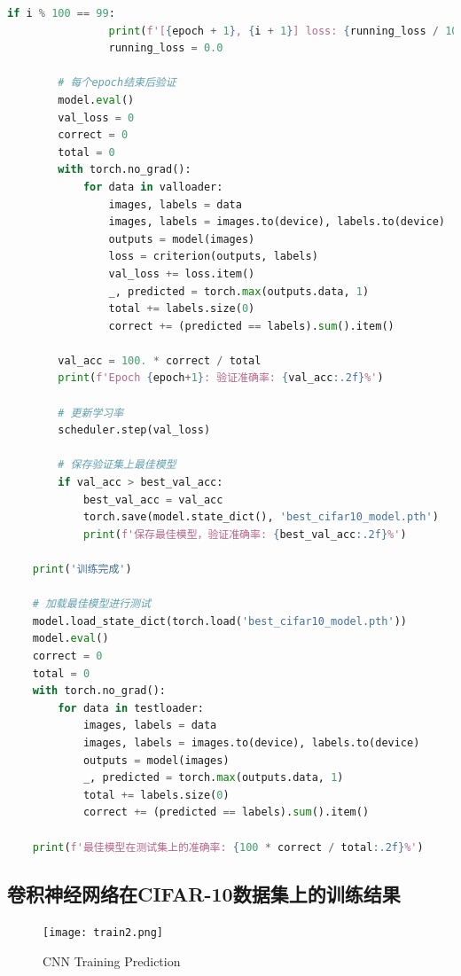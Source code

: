 \documentclass[UTF8]{report}
\theoremstyle{MyLineTheoremStyle} %
\theoremstyle{MyBlockTheoremStyle} %
\theoremstyle{MySubsubsectionStyle} %
\begin{document}
\begin{lstlisting}[language=python, caption={神经网络CNN训练（纯手写）}, label={lst:cnn_train_handwritten}]
            if i % 100 == 99:
                print(f'[{epoch + 1}, {i + 1}] loss: {running_loss / 100:.3f} | acc: {100.*correct/total:.2f}%')
                running_loss = 0.0
        
        # 每个epoch结束后验证
        model.eval()
        val_loss = 0
        correct = 0
        total = 0
        with torch.no_grad():
            for data in valloader:
                images, labels = data
                images, labels = images.to(device), labels.to(device)
                outputs = model(images)
                loss = criterion(outputs, labels)
                val_loss += loss.item()
                _, predicted = torch.max(outputs.data, 1)
                total += labels.size(0)
                correct += (predicted == labels).sum().item()
        
        val_acc = 100. * correct / total
        print(f'Epoch {epoch+1}: 验证准确率: {val_acc:.2f}%')
        
        # 更新学习率
        scheduler.step(val_loss)
        
        # 保存验证集上最佳模型
        if val_acc > best_val_acc:
            best_val_acc = val_acc
            torch.save(model.state_dict(), 'best_cifar10_model.pth')
            print(f'保存最佳模型，验证准确率: {best_val_acc:.2f}%')

    print('训练完成')

    # 加载最佳模型进行测试
    model.load_state_dict(torch.load('best_cifar10_model.pth'))
    model.eval()
    correct = 0
    total = 0
    with torch.no_grad():
        for data in testloader:
            images, labels = data
            images, labels = images.to(device), labels.to(device)
            outputs = model(images)
            _, predicted = torch.max(outputs.data, 1)
            total += labels.size(0)
            correct += (predicted == labels).sum().item()

    print(f'最佳模型在测试集上的准确率: {100 * correct / total:.2f}%')
\end{lstlisting}


\subsection{卷积神经网络在CIFAR-10数据集上的训练结果}


\begin{figure}[H]
    \centering
    \texttt{[image: train2.png]}
    \caption{CNN Training Prediction}
    \label{fig:cnn_validation_accuracy}
\end{figure}
\end{document}
